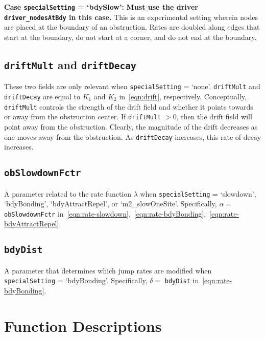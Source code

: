 \documentclass[11pt, oneside]{article}   	%
\theoremstyle{definition}
\begin{document}
{\bf Case \texttt{specialSetting} = `bdySlow':} {\bf Must use the driver \texttt{driver\_nodesAtBdy} in this case.} This is an experimental setting wherein nodes are placed at the boundary of an obstruction. Rates are doubled along edges that start at the boundary, do not start at a corner, and do not end at the boundary.
 
\subsection{\texttt{driftMult} and \texttt{driftDecay}}
These two fields are only relevant when \texttt{specialSetting} = `none'. \texttt{driftMult} and \texttt{driftDecay} are equal to $K_1$ and $K_2$ in~\eqref{eqn:drift}, respectively. Conceptually, \texttt{driftMult} controls the strength of the drift field and whether it points towards or away from the obstruction center. If \texttt{driftMult} $> 0$, then the drift field will point away from the obstruction. Clearly, the magnitude of the drift decreases as one moves away from the obstruction. As \texttt{driftDecay} increases, this rate of decay increases.

\subsection{\texttt{obSlowdownFctr}}
A parameter related to the rate function $\lambda$ when \texttt{specialSetting} = `slowdown', `bdyBonding', `bdyAttractRepel', or `m2\_slowOneSite'. Specifically, $\alpha = $ \texttt{obSlowdownFctr} in~\eqref{eqn:rate-slowdown},~\eqref{eqn:rate-bdyBonding},~\eqref{eqn:rate-bdyAttractRepel}.

\subsection{\texttt{bdyDist}}
A parameter that determines which jump rates are modified when \texttt{specialSetting} = `bdyBonding'. Specifically, $\delta = $ \texttt{bdyDist} in~\eqref{eqn:rate-bdyBonding}.

\section{Function Descriptions}
\end{document}
